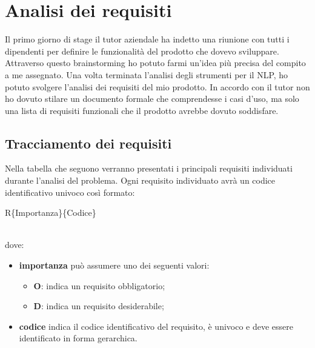 
\chapter{Analisi dei requisiti}
\label{cap:analisi}

Il primo giorno di stage il tutor aziendale ha indetto una riunione con tutti i dipendenti per definire le funzionalità del prodotto che dovevo sviluppare. Attraverso questo \gls{brainstorming} ho potuto farmi un'idea più precisa del compito a me assegnato. Una volta terminata l'analisi degli strumenti per il \gls{NLP}, ho potuto svolgere l'analisi dei requisiti del mio prodotto. In accordo con il tutor non ho dovuto stilare un documento formale che comprendesse i casi d'uso, ma solo una lista di requisiti funzionali che il prodotto avrebbe dovuto soddisfare.

\section{Tracciamento dei requisiti}
\label{requisiti}
Nella tabella che seguono verranno presentati i principali requisiti individuati durante l’analisi del problema.
Ogni requisito individuato avrà un codice identificativo univoco così formato: \\
\centerline{R\{Importanza\}\{Codice\}} \\ 
dove:
\begin{itemize}
	\item \textbf{importanza} può assumere uno dei seguenti valori:
	\begin{itemize}
		\item \textbf{O}: indica un requisito obbligatorio;
		\item \textbf{D}: indica un requisito desiderabile;
	\end{itemize}
	\item \textbf{codice} indica il codice identificativo del requisito, è univoco e deve essere
identificato in forma gerarchica.
\end{itemize}

